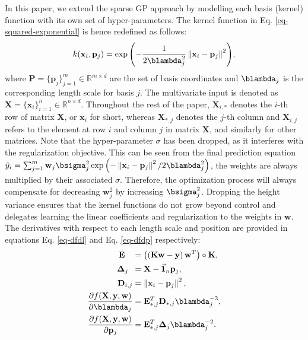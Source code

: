 \documentclass[useAMS,usenatbib,fleqn]{mn2e}
\begin{document}
In this paper, we extend the sparse GP approach by modelling each basis (kernel) function with its own set of hyper-parameters. The kernel function in Eq. \eqref{eq-squared-exponential} is hence redefined as follows:
\begin{equation}
\label{eq-squared-exponential-extension}
k(\mathbf{x}_{i},\mathbf{p}_{j}) = \exp{\left(-\frac{1}{2\blambda_{j}^{2}}\left\| \mathbf{x}_{i}-\mathbf{p}_{j}\right\|^{2}\right)},
\end{equation}
where $\mathbf{P}=\{\mathbf{p}_{j}\}_{j=1}^{m} \in \mathbb{R}^{m\times d}$ are the set of basis coordinates and $\blambda_{j}$ is the corresponding length scale for basis $j$. The multivariate input is denoted as $\mathbf{X}=\{\mathbf{x}_{i}\}_{i=1}^{n} \in \mathbb{R}^{n\times d}$. Throughout the rest of the paper, $\mathbf{X}_{i,*}$ denotes the $i$-th row of matrix $\mathbf{X}$, or $\mathbf{x}_{i}$ for short, whereas $\mathbf{X}_{*,j}$ denotes the $j$-th column and $\mathbf{X}_{i,j}$ refers to the element at row $i$ and column $j$ in matrix $\mathbf{X}$, and similarly for other matrices. Note that the hyper-parameter $\sigma$ has been dropped, as it interferes with the regularization objective. This can be seen from the final prediction equation $\hat y_{i}=\sum_{j=1}^{m}\mathbf{w}_{j}\bsigma_{j}^{2}\exp{\left(-\left\| \mathbf{x}_{i}-\mathbf{p}_{j}\right\|^{2}/2\blambda_{j}^{2}\right)}$, the weights are always multiplied by their associated $\sigma$. Therefore, the optimization process will always compensate for decreasing $\mathbf{w}_{j}^{2}$ by increasing $\bsigma_{j}^{2}$. Dropping the height variance ensures that the kernel functions do not grow beyond control and delegates learning the linear coefficients and regularization to the weights in $\mathbf{w}$. The derivatives with respect to each length scale and position are provided in equations Eq. \eqref{eq-dfdl} and Eq. \eqref{eq-dfdp} respectively:
\begin{subequations}
\begin{align}
\mathbf{E}\phantom{_{i,j}} &= \left(\left(\mathbf{K}\mathbf{w}-\mathbf{y}\right)\mathbf{w}^{T}\right)\circ\mathbf{K},\\
\mathbf\Delta_{j\phantom{,i}} &= \mathbf{X}-\vec{\mathbf{1}}_{n}\mathbf{p}_{j},\\
\mathbf{D}_{i,j} &= \left \| \mathbf{x}_{i}-\mathbf{p}_{j}\right\|^{2},\\
\label{eq-dfdl}
\frac{\partial f(\mathbf{X},\mathbf{y},\mathbf{w})}{\partial \blambda_{j}} &=\mathbf{E}_{*,j}^{T}\mathbf{D}_{*,j}\blambda_{j}^{-3},\\
\label{eq-dfdp}
\frac{\partial f(\mathbf{X},\mathbf{y},\mathbf{w})}{\partial \mathbf{p}_{j}} &=\mathbf{E}_{*,j}^{T}\mathbf\Delta_{j}\blambda_{j}^{-2}.
\end{align}
\end{subequations}
\end{document}
